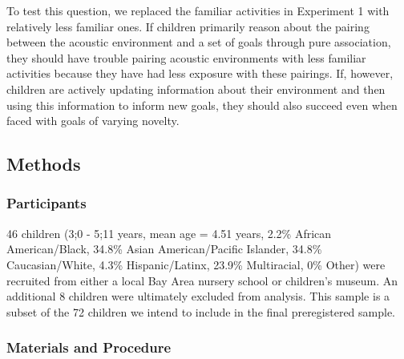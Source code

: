 \documentclass[10pt, letterpaper]{article}
\begin{document}
To test this question, we replaced the familiar activities in Experiment
1 with relatively less familiar ones. If children primarily reason about
the pairing between the acoustic environment and a set of goals through
pure association, they should have trouble pairing acoustic environments
with less familiar activities because they have had less exposure with
these pairings. If, however, children are actively updating information
about their environment and then using this information to inform new
goals, they should also succeed even when faced with goals of varying
novelty.

\hypertarget{methods-1}{%
\subsection{Methods}\label{methods-1}}

\hypertarget{participants-1}{%
\subsubsection{Participants}\label{participants-1}}

46 children (3;0 - 5;11 years, mean age = 4.51 years, 2.2\% African
American/Black, 34.8\% Asian American/Pacific Islander, 34.8\%
Caucasian/White, 4.3\% Hispanic/Latinx, 23.9\% Multiracial, 0\% Other)
were recruited from either a local Bay Area nursery school or children's
museum. An additional 8 children were ultimately excluded from analysis.
This sample is a subset of the 72 children we intend to include in the
final preregistered sample.

\hypertarget{materials-and-procedure-1}{%
\subsubsection{Materials and
Procedure}\label{materials-and-procedure-1}}
\end{document}
